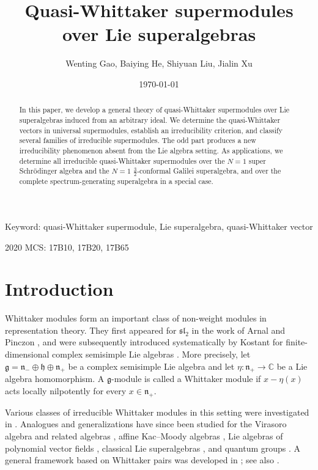 \documentclass[12pt,reqno]{article}
\title{Quasi-Whittaker supermodules over Lie superalgebras}
\author{Wenting Gao, Baiying He, Shiyuan Liu, Jialin Xu}
\date{\today}
\def\F{\mathfrak}
\def\CC{\mathbb{C}}
\begin{document}
	\maketitle
	
\begin{abstract}
	In this paper, we develop a general theory of quasi-Whittaker supermodules over Lie superalgebras induced from an arbitrary ideal. We determine the quasi-Whittaker vectors in universal supermodules, establish an irreducibility criterion, and classify several families of irreducible supermodules. The odd part produces a new irreducibility phenomenon absent from the Lie algebra setting. As applications, we determine all  irreducible quasi-Whittaker supermodules over   the $N=1$ super Schrödinger algebra and the $N=1$ $\frac{3}{2}$-conformal Galilei superalgebra, and over the complete spectrum-generating superalgebra in a special case.	
	\end{abstract}
	
	Keyword: quasi-Whittaker supermodule, Lie superalgebra, quasi-Whittaker vector

2020 MCS: 17B10, 17B20, 17B65


\section{Introduction}

Whittaker modules form an important class of non-weight modules in
representation theory. They first appeared for $\F{sl}_2$ in the 
work of Arnal and Pinczon \cite{AP}, and were subsequently
introduced systematically by Kostant for finite-dimensional complex
 semisimple Lie algebras \cite{K}. More precisely, let $\F{g}=\F{n}
 _{-}\oplus\F{h}\oplus\F{n}_{+}$ be a complex semisimple Lie algebra
 and let $\eta\colon\F{n}_{+}\rightarrow\CC$ be a Lie algebra
  homomorphism. A $\F{g}$-module is called a Whittaker module if 
 $x-\eta(x)$ acts locally nilpotently for every $x\in\F{n}_{+}$. 
 
 
 Various classes of irreducible Whittaker modules in this setting were 
 investigated in \cite{B,K,M1,M2,MS}. Analogues and generalizations
 have since been studied for the Virasoro algebra and related
 algebras \cite{LPX1,LZ,LGZ,OW}, affine Kac--Moody algebras 
 \cite{ALZ,CGLW}, Lie algebras of polynomial vector fields \cite{ZL},
  classical Lie superalgebras \cite{C}, and quantum groups
  \cite{O,XZ,XGZ}.
A general framework based on Whittaker pairs was developed in \cite{BM}; see also \cite{MZ}. 
\end{document}
